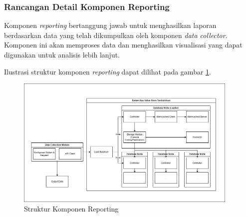 \subsubsection{Rancangan Detail Komponen Reporting}
\label{subsubsection:detail-reporting}

Komponen \textit{reporting} bertanggung jawab untuk menghasilkan laporan berdasarkan data yang telah dikumpulkan oleh komponen \textit{data collector}. Komponen ini akan memproses data dan menghasilkan visualisasi yang dapat digunakan untuk analisis lebih lanjut.

Ilustrasi struktur komponen \textit{reporting} dapat dilihat pada gambar \ref{fig:reporting-structure}.

\begin{figure}[ht]
    \centering
    \includegraphics[width=0.95\textwidth]{resources/chapter-3/general-architecture.png}
    \caption{Struktur Komponen Reporting}
    \label{fig:reporting-structure}
\end{figure}